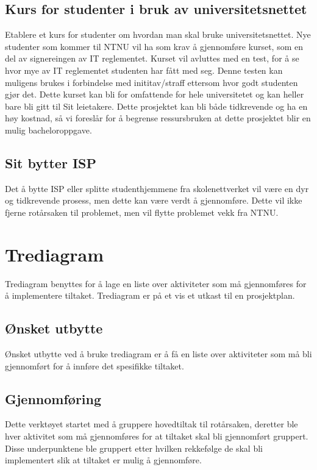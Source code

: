 \subsection{Kurs for studenter i bruk av universitetsnettet}
Etablere et kurs for studenter om hvordan man skal bruke universitetsnettet. Nye studenter som kommer til NTNU vil ha som krav å gjennomføre kurset, som en del av signereingen av IT reglementet. Kurset vil avluttes med en test, for å se hvor mye av IT reglementet studenten har fått med seg. Denne testen kan muligens brukes i forbindelse med inititav/straff ettersom hvor godt studenten gjør det. Dette kurset kan bli for omfattende for hele universitetet og kan heller bare bli gitt til Sit leietakere. Dette prosjektet kan bli både tidkrevende og ha en høy kostnad, så vi foreslår for å begrense ressursbruken at dette prosjektet blir en mulig bacheloroppgave.   

\subsection{Sit bytter ISP}
Det å bytte ISP eller splitte studenthjemmene fra skolenettverket vil være en dyr og tidkrevende prosess, men dette kan være verdt å gjennomføre. Dette vil ikke fjerne rotårsaken til problemet, men vil flytte problemet vekk fra NTNU.


\section{Trediagram}
Trediagram benyttes for å lage en liste over aktiviteter som må gjennomføres for å implementere tiltaket. Trediagram er på et vis et utkast til en prosjektplan.

\subsection{Ønsket utbytte}
Ønsket utbytte ved å bruke trediagram er å få en liste over aktiviteter som må bli gjennomført for å innføre det spesifikke tiltaket.   

\subsection{Gjennomføring}
Dette verktøyet startet med å gruppere hovedtiltak til rotårsaken, deretter ble hver aktivitet som må gjennomføres for at tiltaket skal bli gjennomført gruppert. Disse underpunktene ble gruppert etter hvilken rekkefølge de skal bli implementert slik at tiltaket er mulig å gjennomføre. 

